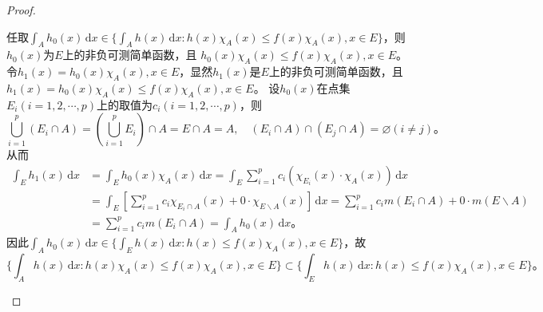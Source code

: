 \documentclass[../../main.tex]{subfiles}
\begin{document}
\begin{proof}
\begin{enumerate}[(1)]
任取$\int_A h_0(x)\,\mathrm{d}x \in \{\int_A h(x)\,\mathrm{d}x : h(x) \chi_A(x) \leqslant f(x) \chi_A(x), x \in E\}$，则$h_0(x)$为$E$上的非负可测简单函数，且
$h_0(x) \chi_A(x) \leqslant f(x) \chi_A(x), x \in E$。
令$h_1(x) = h_0(x) \chi_A(x), x \in E$，显然$h_1(x)$是$E$上的非负可测简单函数，且
$h_1(x) = h_0(x) \chi_A(x) \leqslant f(x) \chi_A(x), x \in E$。
设$h_0(x)$在点集$E_i (i = 1,2,\cdots,p)$上的取值为$c_i (i = 1,2,\cdots,p)$，则
\[
\bigcup_{i=1}^p (E_i\cap A) = (\bigcup_{i=1}^p E_i) \cap A = E\cap A = A,\quad (E_i\cap A) \cap (E_j\cap A) = \varnothing (i\ne j)。
\]
从而
\begin{align*}
\int_E h_1(x)\,\mathrm{d}x &= \int_E h_0(x) \chi_A(x)\,\mathrm{d}x = \int_E \sum_{i=1}^p c_i (\chi_{E_i}(x) \cdot \chi_A(x))\,\mathrm{d}x \\
&= \int_E \left[ \sum_{i=1}^p c_i \chi_{E_i\cap A}(x) + 0 \cdot \chi_{E\backslash A}(x) \right]\,\mathrm{d}x = \sum_{i=1}^p c_i m(E_i\cap A) + 0 \cdot m(E\backslash A) \\
&= \sum_{i=1}^p c_i m(E_i\cap A) = \int_A h_0(x)\,\mathrm{d}x。
\end{align*}
因此$\int_A h_0(x)\,\mathrm{d}x \in \{\int_E h(x)\,\mathrm{d}x : h(x) \leqslant f(x) \chi_A(x), x \in E\}$，故
\[
\{\int_A h(x)\,\mathrm{d}x : h(x) \chi_A(x) \leqslant f(x) \chi_A(x), x \in E\} \subset \{\int_E h(x)\,\mathrm{d}x : h(x) \leqslant f(x) \chi_A(x), x \in E\}。
\]


\end{enumerate}
\end{proof}
\end{document}
